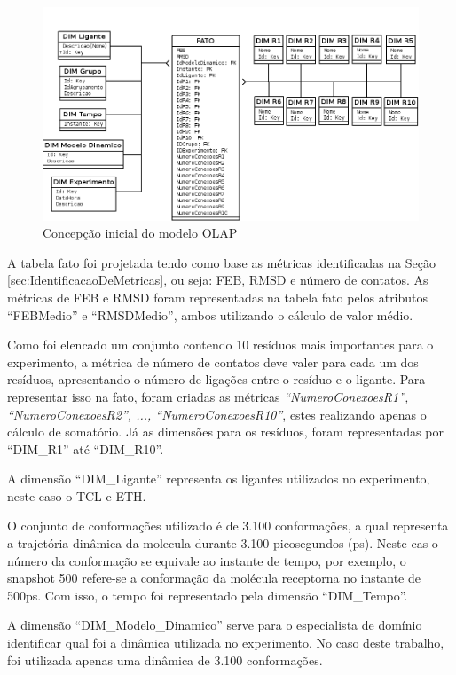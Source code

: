 \begin{figure}[h]
        \center
        \includegraphics[scale=0.45]{images/Modelo_OLAP.png}
        \caption{Concepção inicial do modelo OLAP}
        \label{fig:ConcepcaoModeloOLAP}
\end{figure}

A tabela fato foi projetada tendo como base as métricas identificadas na Seção \ref{sec:IdentificacaoDeMetricas}, ou seja: FEB, RMSD e número de contatos. As métricas de FEB e RMSD foram representadas na tabela fato pelos atributos ``FEBMedio'' e ``RMSDMedio'', ambos utilizando o cálculo de valor médio.

Como foi elencado um conjunto contendo 10 resíduos mais importantes para o experimento, a métrica de número de contatos deve valer para cada um dos resíduos, apresentando o número de ligações entre o resíduo e o ligante. Para representar isso na fato, foram criadas as métricas \emph{``NumeroConexoesR1'', ``NumeroConexoesR2'', ..., ``NumeroConexoesR10''}, estes realizando apenas o cálculo de somatório. Já as dimensões para os resíduos, foram representadas por ``DIM\_R1'' até ``DIM\_R10''.

A dimensão ``DIM\_Ligante'' representa os ligantes utilizados no experimento, neste caso o TCL e ETH.

O conjunto de conformações utilizado é de 3.100 conformações, a qual representa a trajetória dinâmica da molecula durante 3.100 picosegundos (ps). Neste cas o número da conformação se equivale ao instante de tempo, por exemplo, o snapshot 500 refere-se a conformação da molécula receptorna no instante de 500ps. Com isso, o tempo foi representado pela dimensão ``DIM\_Tempo''. 

A dimensão ``DIM\_Modelo\_Dinamico'' serve para o especialista de domínio identificar qual foi a dinâmica utilizada no experimento. No caso deste trabalho, foi utilizada apenas uma dinâmica de 3.100 conformações.

